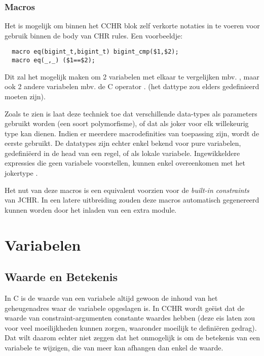\subsubsection{Macros}

Het is mogelijk om binnen het CCHR blok zelf verkorte notaties in te voeren voor gebruik binnen de body van CHR rules. Een voorbeeldje: \begin{Verbatim}
  macro eq(bigint_t,bigint_t) bigint_cmp($1,$2);
  macro eq(_,_) ($1==$2);
\end{Verbatim}

Dit zal het mogelijk maken om 2  variabelen met elkaar te vergelijken mbv. , maar ook 2 andere variabelen mbv. de C operator \code{==}. (het dattype  zou elders gedefinieerd moeten zijn).

Zoals te zien is laat deze techniek toe dat verschillende data-types als parameters gebruikt worden (een soort polymorfisme), of dat \code{\_} als joker voor elk willekeurig type kan dienen. Indien er meerdere macrodefinities van toepassing zijn, wordt de eerste gebruikt. De datatypes zijn echter enkel bekend voor pure variabelen, gedefini\"eerd in de head van een regel, of als lokale variabele. Ingewikkeldere expressies die geen variabele voorstellen, kunnen enkel overeenkomen met het jokertype \code{\_}.

Het nut van deze macros is een equivalent voorzien voor de {\em built-in constraints} van JCHR. In een latere uitbreiding zouden deze macros automatisch gegenereerd kunnen worden door het inladen van een extra module.

\section{Variabelen} \label{sec:taal-var}

\subsection{Waarde en Betekenis}

In C is de waarde van een variabele altijd gewoon de inhoud van het geheugenadres waar de variabele opgeslagen is. In CCHR wordt ge\"eist dat de waarde van constraint-argumenten constante waardes hebben (deze eis laten zou voor veel moeilijkheden kunnen zorgen, waaronder moeilijk te defini\"eren gedrag). Dat wilt daarom echter niet zeggen dat het onmogelijk is om de betekenis van een variabele te wijzigen, die van meer kan afhangen dan enkel de waarde. 

